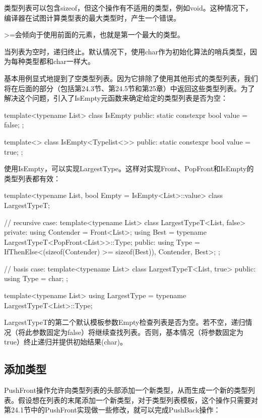 \begin{notice}
类型列表可以包含sizeof，但这个操作有不适用的类型，例如void。这种情况下，编译器在试图计算类型表的最大类型时，产生一个错误。
\end{notice}

>=会倾向于使用前面的元素，也就是第一个最大的类型。

当列表为空时，递归终止。默认情况下，使用char作为初始化算法的哨兵类型，因为每种类型都和char一样大。

基本用例显式地提到了空类型列表。因为它排除了使用其他形式的类型列表，我们将在后面的部分（包括第24.3节、第24.5节和第25章）中返回这些类型列表。为了解决这个问题，引入了IsEmpty元函数来确定给定的类型列表是否为空：

\begin{cpp}
template<typename List>
class IsEmpty {
	public:
	static constexpr bool value = false;
};

template<>
class IsEmpty<Typelist<>> {
	public:
	static constexpr bool value = true;
};
\end{cpp}

使用IsEmpty，可以实现LargestType。这样对实现Front、PopFront和IsEmpty的类型列表都有效：

\begin{cpp}
template<typename List, bool Empty = IsEmpty<List>::value>
class LargestTypeT;

// recursive case:
template<typename List>
class LargestTypeT<List, false> {
	private:
	using Contender = Front<List>;
	using Best = typename LargestTypeT<PopFront<List>>::Type;
	public:
	using Type = IfThenElse<(sizeof(Contender) >= sizeof(Best)),
	Contender, Best>;
};

// basis case:
template<typename List>
class LargestTypeT<List, true> {
	public:
	using Type = char;
};

template<typename List>
using LargestType = typename LargestTypeT<List>::Type;
\end{cpp}

LargestTypeT的第二个默认模板参数Empty检查列表是否为空。若不空，递归情况（将此参数固定为false）将继续查找列表。否则，基本情况（将参数固定为true）终止递归并提供初始结果(char)。

\subsection{添加类型}

PushFront操作允许向类型列表的头部添加一个新类型，从而生成一个新的类型列表。假设想在列表的末尾添加一个新类型，对于类型列表模板，这个操作只需要对第24.1节中的PushFront实现做一些修改，就可以完成PushBack操作：

